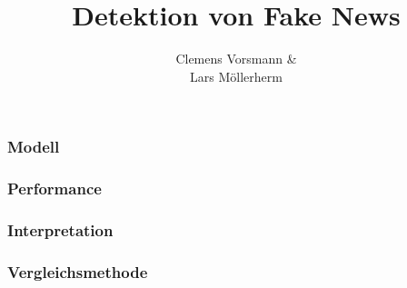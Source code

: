 \documentclass[aspectratio=1610, professionalfonts, 9pt]{beamer}
\title{Detektion von Fake News}
\author{%
  Clemens Vorsmann \& \\ 
  Lars Möllerherm
}
\institute{Fakultät Physik}
\begin{document}
  \begin{frame}
    \titlepage
  \end{frame}

  \begin{frame}
    \frametitle{Modell}
  \end{frame}

  \begin{frame}
    \frametitle{Performance}
  \end{frame}

  \begin{frame}
    \frametitle{Interpretation}
  \end{frame}

  \begin{frame}
    \frametitle{Vergleichsmethode}
  \end{frame}

  \begin{frame}
    \printbibliography
  \end{frame}
\end{document}
